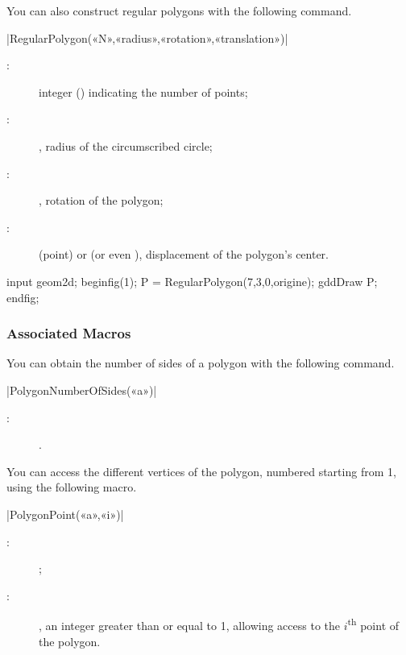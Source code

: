 \documentclass[a4paper,english]{article}
\begin{document}
You can also construct regular polygons with the following command.
\begin{colourband}
\macro|RegularPolygon(«N»,«radius»,«rotation»,«translation»)|
\begin{description}
  \item[:] integer () indicating the number of points;
  \item[:] , radius of the circumscribed circle;
  \item[:]  , rotation of the polygon;
  \item[:]  \typeGDD(point) or  (or even
  ), displacement of the polygon's center.
\end{description}
\end{colourband}

\begin{ExempleMP}
input geom2d;
beginfig(1);
P = RegularPolygon(7,3,0,origine);
gddDraw P;
endfig;
\end{ExempleMP}

\subsubsection{Associated Macros}

You can obtain the number of sides of a polygon with the following command.

\begin{colourband}
\macro|PolygonNumberOfSides(«a»)|
\begin{description}
  \item[:]  .
\end{description}
\end{colourband}
\bigskip

You can access the different vertices of the polygon, numbered starting from 1, using the following macro.

\begin{colourband}
\macro|PolygonPoint(«a»,«i»)|
\begin{description}
  \item[:]  ;
  \item[:] , an integer greater than or equal to 1, allowing access to the $i$\textsuperscript{th} point of the polygon.
\end{description}
\end{colourband}
\bigskip
\end{document}
